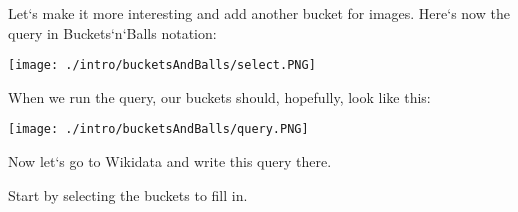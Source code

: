 \newpage
Let`s make it more interesting and add another bucket for images. Here`s now the query in Buckets`n`Balls notation:

\begin{figure*}[h!]
\texttt{[image: ./intro/bucketsAndBalls/select.PNG]}
\end{figure*}

When we run the query, our buckets should, hopefully, look like this:

\begin{figure*}[h!]
\texttt{[image: ./intro/bucketsAndBalls/query.PNG]}
\end{figure*}

Now let`s go to Wikidata and write this query there.

Start by selecting the buckets to fill in.
